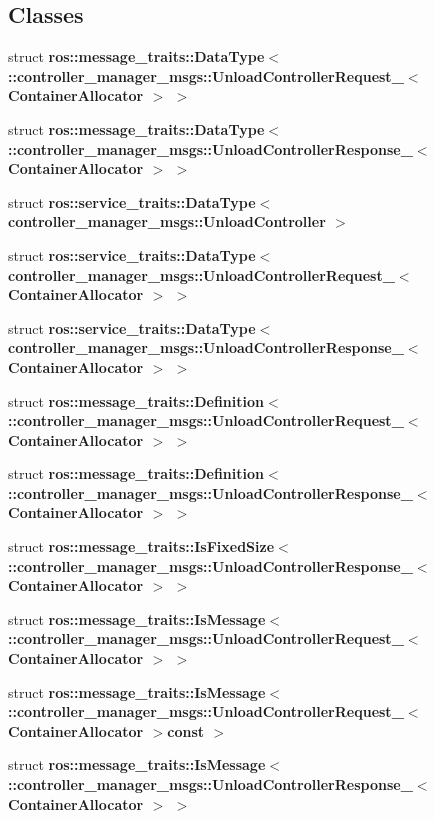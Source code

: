 \subsection*{\-Classes}
\begin{DoxyCompactItemize}
\item 
struct {\bf ros\-::message\-\_\-traits\-::\-Data\-Type$<$ \-::controller\-\_\-manager\-\_\-msgs\-::\-Unload\-Controller\-Request\-\_\-$<$ Container\-Allocator $>$ $>$}
\item 
struct {\bf ros\-::message\-\_\-traits\-::\-Data\-Type$<$ \-::controller\-\_\-manager\-\_\-msgs\-::\-Unload\-Controller\-Response\-\_\-$<$ Container\-Allocator $>$ $>$}
\item 
struct {\bf ros\-::service\-\_\-traits\-::\-Data\-Type$<$ controller\-\_\-manager\-\_\-msgs\-::\-Unload\-Controller $>$}
\item 
struct {\bf ros\-::service\-\_\-traits\-::\-Data\-Type$<$ controller\-\_\-manager\-\_\-msgs\-::\-Unload\-Controller\-Request\-\_\-$<$ Container\-Allocator $>$ $>$}
\item 
struct {\bf ros\-::service\-\_\-traits\-::\-Data\-Type$<$ controller\-\_\-manager\-\_\-msgs\-::\-Unload\-Controller\-Response\-\_\-$<$ Container\-Allocator $>$ $>$}
\item 
struct {\bf ros\-::message\-\_\-traits\-::\-Definition$<$ \-::controller\-\_\-manager\-\_\-msgs\-::\-Unload\-Controller\-Request\-\_\-$<$ Container\-Allocator $>$ $>$}
\item 
struct {\bf ros\-::message\-\_\-traits\-::\-Definition$<$ \-::controller\-\_\-manager\-\_\-msgs\-::\-Unload\-Controller\-Response\-\_\-$<$ Container\-Allocator $>$ $>$}
\item 
struct {\bf ros\-::message\-\_\-traits\-::\-Is\-Fixed\-Size$<$ \-::controller\-\_\-manager\-\_\-msgs\-::\-Unload\-Controller\-Response\-\_\-$<$ Container\-Allocator $>$ $>$}
\item 
struct {\bf ros\-::message\-\_\-traits\-::\-Is\-Message$<$ \-::controller\-\_\-manager\-\_\-msgs\-::\-Unload\-Controller\-Request\-\_\-$<$ Container\-Allocator $>$ $>$}
\item 
struct {\bf ros\-::message\-\_\-traits\-::\-Is\-Message$<$ \-::controller\-\_\-manager\-\_\-msgs\-::\-Unload\-Controller\-Request\-\_\-$<$ Container\-Allocator $>$const  $>$}
\item 
struct {\bf ros\-::message\-\_\-traits\-::\-Is\-Message$<$ \-::controller\-\_\-manager\-\_\-msgs\-::\-Unload\-Controller\-Response\-\_\-$<$ Container\-Allocator $>$ $>$}
\item 

\end{DoxyCompactItemize}
